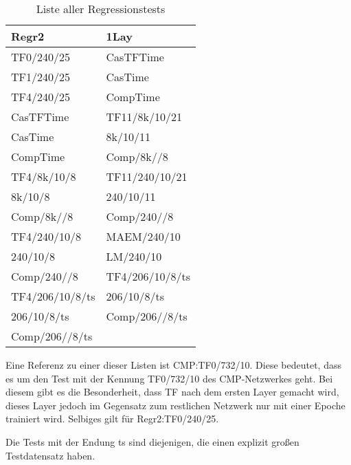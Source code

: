 \begin{table}[!ht]
    \centering
    \begin{tabular}{l|l}
        \textbf{Regr2} & \textbf{1Lay} \\
        \hline
        TF0/240/25 & CasTFTime \\
        TF1/240/25 & CasTime \\
        TF4/240/25 & CompTime \\
        CasTFTime & TF11/8k/10/21 \\
        CasTime & 8k/10/11 \\
        CompTime & Comp/8k//8 \\
        TF4/8k/10/8 & TF11/240/10/21 \\
        8k/10/8 & 240/10/11 \\
        Comp/8k//8 & Comp/240//8 \\
        TF4/240/10/8 & MAEM/240/10 \\
        240/10/8 & LM/240/10 \\
        Comp/240//8 & TF4/206/10/8/ts \\
        TF4/206/10/8/ts & 206/10/8/ts \\
        206/10/8/ts & Comp/206//8/ts \\
        Comp/206//8/ts &
    \end{tabular}
    \caption{\label{tab:regrtests} Liste aller Regressionstests}
\end{table}

Eine Referenz zu einer dieser Listen ist CMP:TF0/732/10. Diese bedeutet, dass es um den Test mit der Kennung TF0/732/10 des CMP-Netzwerkes geht. 
Bei diesem gibt es die Besonderheit, dass TF nach dem ersten Layer gemacht wird, dieses Layer jedoch im 
Gegensatz zum restlichen Netzwerk nur mit einer Epoche trainiert wird.
Selbiges gilt für Regr2:TF0/240/25.

Die Tests mit der Endung ts sind diejenigen, die einen explizit großen Testdatensatz haben. 
